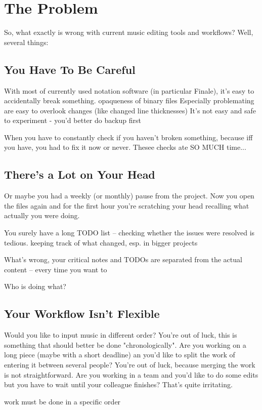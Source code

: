 \documentclass[11pt,a4paper]{article}
\begin{document}
\section{The Problem}
So, what exactly is wrong with current music editing tools and workflows?
Well, several things:

\subsection{You Have To Be Careful}
With most of currently used notation software (in particular Finale), it's easy
to accidentally break something.
opaqueness of binary files
Especially problemating are easy to overlook changes (like changed line thicknesses)
It's not easy and safe to experiment - you'd better do backup first

When you have to constantly check if you haven't broken something,
because iff you have, you had to fix it now or never.
Thesee checks ate SO MUCH time...

\subsection{There's a Lot on Your Head}
Or maybe you had a weekly (or monthly) pause from the project.
Now you open the files again and for the first hour you're scratching your head
recalling what actually you were doing.

You surely have a long TODO list -- checking whether the issues were resolved
is tedious.
keeping track of what changed, esp. in bigger projects

What's wrong, your critical notes and TODOs are separated from the actual content --
every time you want to 

Who is doing what?

\subsection{Your Workflow Isn't Flexible}
Would you like to input music in different order?  You're out of luck,
this is something that should better be done "chronologically".
Are you working on a long piece (maybe with a short deadline) an you'd like to split the work
of entering it between several people?  You're out of luck,
because merging the work is not straightforward.
Are you working in a team and you'd like to do some edits but you have to wait
until your colleague finishes?  That's quite irritating.

work must be done in a specific order
\end{document}
